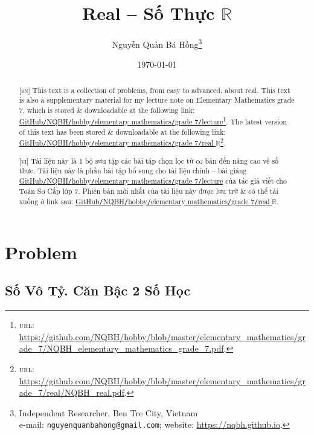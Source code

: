 \documentclass{article}
\title{Real -- Số Thực $\mathbb{R}$}
\author{Nguyễn Quản Bá Hồng\footnote{Independent Researcher, Ben Tre City, Vietnam\\e-mail: \texttt{nguyenquanbahong@gmail.com}; website: \url{https://nqbh.github.io}.}}
\date{\today}
\numberwithin{equation}{section}
\begin{document}
\maketitle
\begin{abstract}
	\textsc{[en]} This text is a collection of problems, from easy to advanced, about real. This text is also a supplementary material for my lecture note on Elementary Mathematics grade 7, which is stored \& downloadable at the following link: \href{https://github.com/NQBH/hobby/blob/master/elementary_mathematics/grade_7/NQBH_elementary_mathematics_grade_7.pdf}{GitHub\texttt{/}NQBH\texttt{/}hobby\texttt{/}elementary mathematics\texttt{/}grade 7\texttt{/}lecture}\footnote{\textsc{url}: \url{https://github.com/NQBH/hobby/blob/master/elementary_mathematics/grade_7/NQBH_elementary_mathematics_grade_7.pdf}.}. The latest version of this text has been stored \& downloadable at the following link: \href{https://github.com/NQBH/hobby/blob/master/elementary_mathematics/grade_7/real/NQBH_real.pdf}{GitHub\texttt{/}NQBH\texttt{/}hobby\texttt{/}elementary mathematics\texttt{/}grade 7\texttt{/}real $\mathbb{R}$}\footnote{\textsc{url}: \url{https://github.com/NQBH/hobby/blob/master/elementary_mathematics/grade_7/real/NQBH_real.pdf}.}.
	\vspace{2mm}
	
	\textsc{[vi]} Tài liệu này là 1 bộ sưu tập các bài tập chọn lọc từ cơ bản đến nâng cao về số thực. Tài liệu này là phần bài tập bổ sung cho tài liệu chính -- bài giảng \href{https://github.com/NQBH/hobby/blob/master/elementary_mathematics/grade_7/NQBH_elementary_mathematics_grade_7.pdf}{GitHub\texttt{/}NQBH\texttt{/}hobby\texttt{/}elementary mathematics\texttt{/}grade 7\texttt{/}lecture} của tác giả viết cho Toán Sơ Cấp lớp 7. Phiên bản mới nhất của tài liệu này được lưu trữ \& có thể tải xuống ở link sau: \href{https://github.com/NQBH/hobby/blob/master/elementary_mathematics/grade_7/real/NQBH_real.pdf}{GitHub\texttt{/}NQBH\texttt{/}hobby\texttt{/}elementary mathematics\texttt{/}grade 7\texttt{/}real $\mathbb{R}$}.
\end{abstract}
\setcounter{secnumdepth}{4}
\setcounter{tocdepth}{3}
\tableofcontents


\section{Problem}

\subsection{Số Vô Tỷ. Căn Bậc 2 Số Học}
\end{document}
